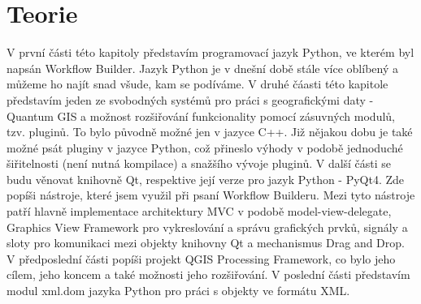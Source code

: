 \chapter{Teorie}
V první části této kapitoly představím programovací jazyk Python, ve kterém byl napsán Workflow Builder. Jazyk Python je v dnešní době stále více oblíbený a můžeme ho najít snad všude, kam se podíváme. V druhé čáasti této kapitole představím jeden ze svobodných systémů pro práci s geografickými daty - Quantum GIS a možnost rozšiřování funkcionality pomocí zásuvných modulů, tzv. pluginů. To bylo původně možné jen v jazyce C++. Již nějakou dobu je také možné psát pluginy v jazyce Python, což přineslo výhody v podobě jednoduché šiřitelnosti (není nutná kompilace) a snažšího vývoje pluginů. V další části se budu věnovat knihovně Qt, respektive její verze pro jazyk Python - PyQt4. Zde popíši nástroje, které jsem využil při psaní Workflow Builderu. Mezi tyto nástroje patří hlavně implementace architektury MVC v podobě model-view-delegate, Graphics View Framework pro vykreslování a správu grafických prvků, signály a sloty pro komunikaci mezi objekty knihovny Qt a mechanismus Drag and Drop. V předposlední části popíši projekt QGIS Processing Framework, co bylo jeho cílem, jeho koncem a také možnosti jeho rozšiřování.  V poslední části představím modul xml.dom jazyka Python pro práci s objekty ve formátu XML.

\newpage




